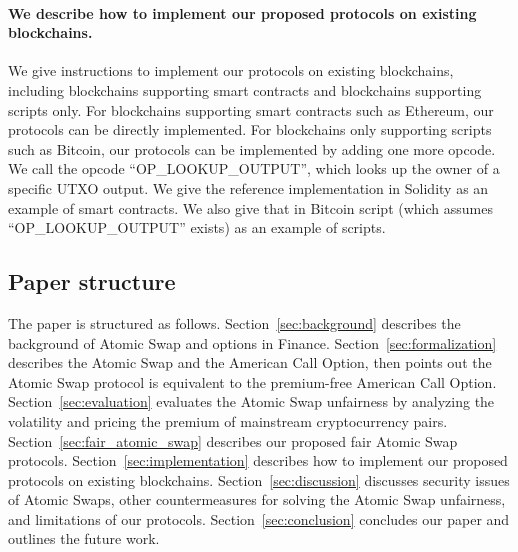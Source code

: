 \paragraph{We describe how to implement our proposed protocols on existing blockchains.}
We give instructions to implement our protocols on existing blockchains,
including blockchains supporting smart contracts and blockchains supporting scripts only.
For blockchains supporting smart contracts such as Ethereum, our protocols can be directly implemented.
For blockchains only supporting scripts such as Bitcoin, our protocols can be implemented by adding one more opcode.
We call the opcode ``OP\_LOOKUP\_OUTPUT'', which looks up the owner of a specific UTXO output.
We give the reference implementation in Solidity as an example of smart contracts.
We also give that in Bitcoin script (which assumes ``OP\_LOOKUP\_OUTPUT'' exists) as an example of scripts.










\subsection{Paper structure}

The paper is structured as follows.
Section~\ref{sec:background} describes the background of Atomic Swap and options in Finance.
Section~\ref{sec:formalization} describes the Atomic Swap and the American Call Option, then points out the Atomic Swap protocol is equivalent to the premium-free American Call Option.
Section~\ref{sec:evaluation} evaluates the Atomic Swap unfairness by analyzing the volatility and pricing the premium of mainstream cryptocurrency pairs.
Section~\ref{sec:fair_atomic_swap} describes our proposed fair Atomic Swap protocols.
Section~\ref{sec:implementation} describes how to implement our proposed protocols on existing blockchains.
Section~\ref{sec:discussion} discusses security issues of Atomic Swaps, other countermeasures for solving the Atomic Swap unfairness, and limitations of our protocols.
Section~\ref{sec:conclusion} concludes our paper and outlines the future work.
